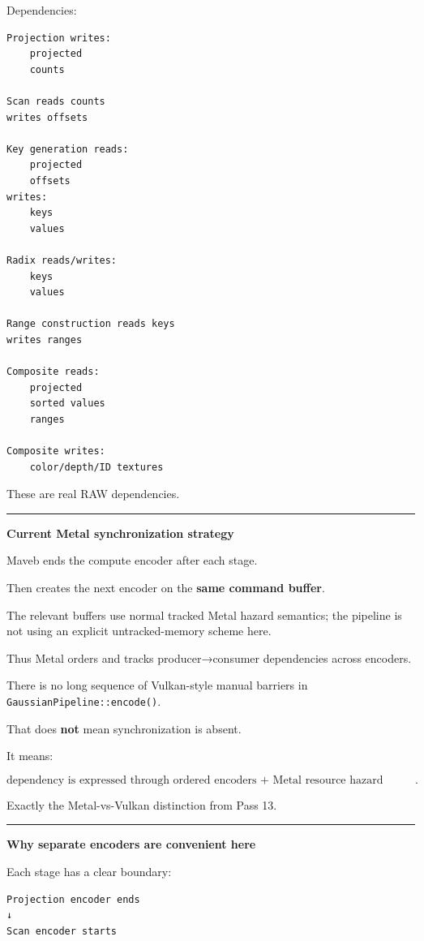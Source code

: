 Dependencies:

\protect{}\label{sd09sx}%
\begin{verbatim}
Projection writes:
    projected
    counts

Scan reads counts
writes offsets

Key generation reads:
    projected
    offsets
writes:
    keys
    values

Radix reads/writes:
    keys
    values

Range construction reads keys
writes ranges

Composite reads:
    projected
    sorted values
    ranges

Composite writes:
    color/depth/ID textures
\end{verbatim}

These are real RAW dependencies.

\begin{center}\rule{0.5\linewidth}{0.5pt}\end{center}

\textbf{Current Metal synchronization strategy}

Maveb ends the compute encoder after each stage.

Then creates the next encoder on the \textbf{same command buffer}.

The relevant buffers use normal tracked Metal hazard semantics; the pipeline is not using an explicit untracked-memory scheme here.

Thus Metal orders and tracks producer→consumer dependencies across encoders.

There is no long sequence of Vulkan-style manual barriers in \texttt{GaussianPipeline::encode()}.

That does \textbf{not} mean synchronization is absent.

It means:

\[
\boxed{
\text{dependency is expressed through ordered encoders + Metal resource hazard tracking}.
}
\]

Exactly the Metal-vs-Vulkan distinction from Pass 13.

\begin{center}\rule{0.5\linewidth}{0.5pt}\end{center}

\textbf{Why separate encoders are convenient here}

Each stage has a clear boundary:

\protect{}\label{9acmg5}%
\begin{verbatim}
Projection encoder ends
↓
Scan encoder starts
\end{verbatim}

